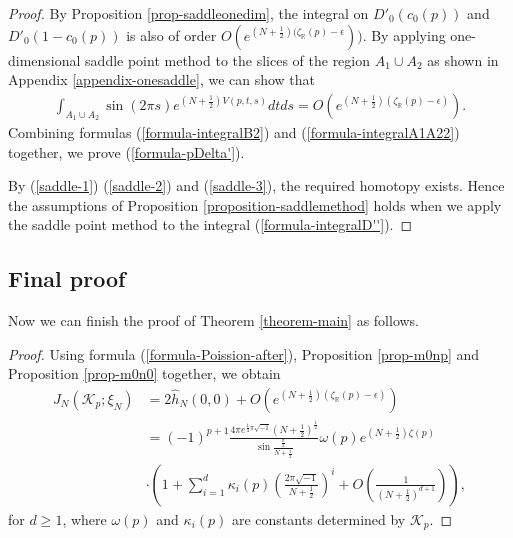 \documentclass[12pt]{amsart}
\begin{document}
\begin{proof}
By Proposition \ref{prop-saddleonedim}, the integral on $D'_0(c_{0}(p))$ and $D'_0(1-c_{0}(p))$ 
is also of order $O(e^{(N+\frac{1}{2})(\zeta_\mathbb{R}(p)-\epsilon}))$. By applying one-dimensional saddle point method to the slices of the region $A_1\cup A_2$ as shown in Appendix \ref{appendix-onesaddle}, we can show that
\begin{align} \label{formula-integralA1A22}
    \int_{A_1\cup A_2}\sin(2\pi s)e^{(N+\frac{1}{2})V(p,t,s)}dtds=O(e^{(N+\frac{1}{2})(\zeta_\mathbb{R}(p)-\epsilon)}).
\end{align}
Combining formulas (\ref{formula-integralB2}) and (\ref{formula-integralA1A22}) together, we prove (\ref{formula-pDelta'}).


 
By (\ref{saddle-1}) (\ref{saddle-2}) and (\ref{saddle-3}), the required homotopy exists. Hence the assumptions of Proposition \ref{proposition-saddlemethod} holds when we apply the saddle point method to the integral (\ref{formula-integralD''}).  
\end{proof}




\subsection{Final proof} \label{subsection-final}

Now we can finish the proof of Theorem \ref{theorem-main} as follows.
\begin{proof}
Using formula (\ref{formula-Poission-after}),  Proposition \ref{prop-m0np} and Proposition \ref{prop-m0n0} together, we obtain
\begin{align}
        J_{N}(\mathcal{K}_p;\xi_N)&=2\hat{h}_{N}(0,0)+O(e^{(N+\frac{1}{2})(\zeta_{\mathbb{R}}(p)-\epsilon)})
        \\\nonumber
        &=(-1)^{p+1}\frac{4\pi e^{\frac{1}{4}\pi\sqrt{-1}}(N+\frac{1}{2})^{\frac{1}{2}}}{\sin\frac{\frac{\pi}{2}}{N+\frac{1}{2}}}\omega(p)e^{(N+\frac{1}{2})\zeta(p)}\\\nonumber
&\cdot\left(1+\sum_{i=1}^d\kappa_i(p)\left(\frac{2\pi\sqrt{-1}}{N+\frac{1}{2}}\right)^i+O\left(\frac{1}{(N+\frac{1}{2})^{d+1}}\right)\right),
    \end{align}
    for $d\geq 1$, where $\omega(p)$ and $\kappa_i(p)$ are constants determined by $\mathcal{K}_p$.
\end{proof}
\end{document}
